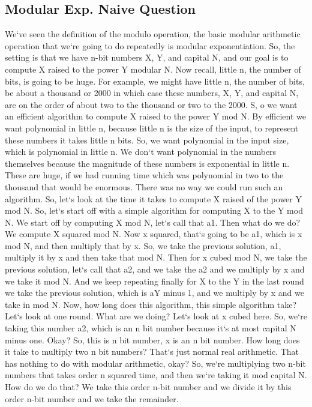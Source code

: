 \subsection{Modular Exp.  Naive Question}
We`ve seen the definition of the modulo operation, the basic modular arithmetic operation that we`re going to do repeatedly is modular exponentiation.
So, the setting is that we have n-bit numbers X, Y, and capital N, and our goal is to compute X raised to the power Y modular N\@.
Now recall, little n, the number of bits, is going to be huge.
For example, we might have little n, the number of bits, be about a thousand or 2000 in which case these numbers, X, Y, and capital N, are on the order of about two to the thousand or two to the 2000.
S, o we want an efficient algorithm to compute X raised to the power Y mod N\@.
By efficient we want polynomial in little n, because little n is the size of the input, to represent these numbers it takes little n bits.
So, we want polynomial in the input size, which is polynomial in little n.
We don`t want polynomial in the numbers themselves because the magnitude of these numbers is exponential in little n.
These are huge, if we had running time which was polynomial in two to the thousand that would be enormous.
There was no way we could run such an algorithm.
So, let`s look at the time it takes to compute X raised of the power Y mod N\@.
So, let`s start off with a simple algorithm for computing X to the Y mod N\@.
We start off by computing X mod N, let`s call that a1.
Then what do we do? We compute X squared mod N\@.
Now x squared, that`s going to be a1, which is x mod N, and then multiply that by x.
So, we take the previous solution, a1, multiply it by x and then take that mod N\@.
Then for x cubed mod N, we take the previous solution, let`s call that a2, and we take the a2 and we multiply by x and we take it mod N\@.
And we keep repeating finally for X to the Y in the last round we take the previous solution, which is aY minus 1, and we multiply by x and we take in mod N\@.
Now, how long does this algorithm, this simple algorithm take? Let`s look at one round.
What are we doing? Let`s look at x cubed here.
So, we`re taking this number a2, which is an n bit number because it`s at most capital N minus one.
Okay? So, this is n bit number, x is an n bit number.
How long does it take to multiply two n bit numbers? That`s just normal real arithmetic.
That has nothing to do with modular arithmetic, okay? So, we`re multiplying two n-bit numbers that takes order n squared time, and then we`re taking it mod capital N\@.
How do we do that? We take this order n-bit number and we divide it by this order n-bit number and we take the remainder.
